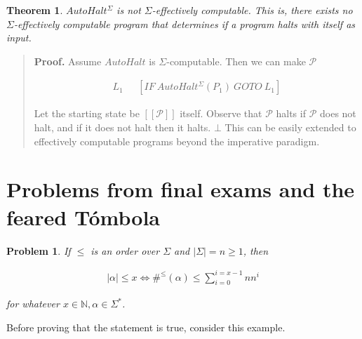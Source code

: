 \documentclass[a4paper, 12pt]{article}
\newtheorem{problem}{Problem}
\newtheorem{theorem}{Theorem}
\newtheorem{problem}{Problem}
\newtheorem{theorem}{Theorem}
\begin{document}
\begin{theorem}
    $AutoHalt^{\Sigma}$ is not $\Sigma$-effectively computable. This is, there
    exists no $\Sigma$-effectively computable program that determines if a
    program halts with itself as input.
\end{theorem}


\small
\begin{quote}

    \textbf{Proof.} Assume $AutoHalt$ is $\Sigma$-computable. Then we can make
    $\mathcal{P}$

    \begin{align*}
        L_1 ~ ~ ~ & [IF ~ AutoHalt^{\Sigma}(P_1) ~ GOTO ~ L_1]
    \end{align*}

    Let the starting state be $[\![ \mathcal{P} ]\!]$ itself. Observe that
    $\mathcal{P}$ halts if $\mathcal{P}$ does not halt, and if it does not halt
    then it halts. $\bot$ This can be easily extended to effectively computable
    programs beyond the imperative paradigm.
\end{quote}
\normalsize

\pagebreak

\section{Problems from final exams and the feared Tómbola}

\begin{problem}
    If $\leq$ is an order over $\Sigma$ and $|\Sigma| = n \geq 1$, then 

    \begin{align*}
        |\alpha| \leq x \iff \#^{\leq}(\alpha) \leq \sum_{i=0}^{i = x - 1} n n^i
    \end{align*}

    for whatever $x \in \mathbb{N}, \alpha \in \Sigma^{*}$.
\end{problem}

Before proving that the statement is true, consider this example.
\end{document}
